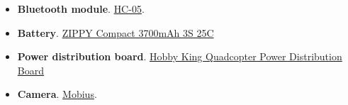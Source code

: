 \begin{itemize}
\item \textbf{Bluetooth module}. \href{http://www.ebay.com/itm/Wireless-Serial-6-Pin-Bluetooth-RF-Transceiver-Module-HC-05-RS232-Master-Slave-/400562862516?pt=LH_DefaultDomain_0&hash=item5d436839b4}{HC-05}.
\item \textbf{Battery}. \href{https://www.hobbyking.com/hobbyking/store/uh_viewItem.asp?idProduct=36195}{ZIPPY Compact 3700mAh 3S 25C}
\item \textbf{Power distribution board}. \href{http://www.hobbyking.com/hobbyking/store/__29048__Hobby_King_Quadcopter_Power_Distribution_Board_UK_Warehouse_.html}{Hobby King Quadcopter Power Distribution Board}
\item \textbf{Camera}. \href{http://www.ebay.com/itm/1080P-HD-Mini-Auto-Record-with-Power-Mobius-ActionCam-Sports-Camera-Camcorder-/221259368601?hash=item3384160899}{Mobius}.
\end{itemize}